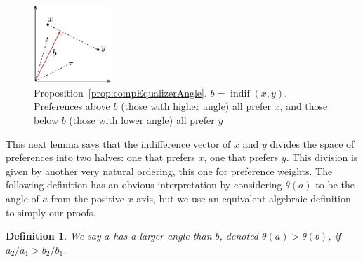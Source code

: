 \documentclass[12pt]{article}
\newtheorem*{definition}{Definition}
\DeclareMathOperator*{\indif}{indif}
\newcommand{\1}[1]{\mathds{1}[{#1}]}
\begin{document}
    \begin{figure}
      \vspace{-0.4in}
      \begin{center}
        \includegraphics[width=0.26\textwidth]{figures/clmAngle}
      \end{center}
      \caption{
        Proposition~\ref{prop:compEqualizerAngle}. $b=\indif(x,y)$.
        Preferences above $b$ (those with higher angle) all prefer $x$,
        and those below $b$ (those with lower angle) all prefer $y$
      }
      \vspace{-0.7in}
    \end{figure}

    This next lemma says that the indifference vector of $x$ and $y$ divides 
    the space of preferences into two halves: one that prefers $x$, one that
    prefers $y$. This division is given by another very natural ordering,
    this one for preference weights. The following definition has an obvious
    interpretation by considering $\theta(a)$ to be the angle of $a$ from the
    positive $x$ axis, but we use an equivalent algebraic definition to simply
    our proofs.

    \begin{definition}
      We say $a$ has a larger angle than $b$, denoted $\theta(a) > \theta(b)$,
      if $a_2 / a_1 > b_2 / b_1$. 
    \end{definition}
\end{document}
